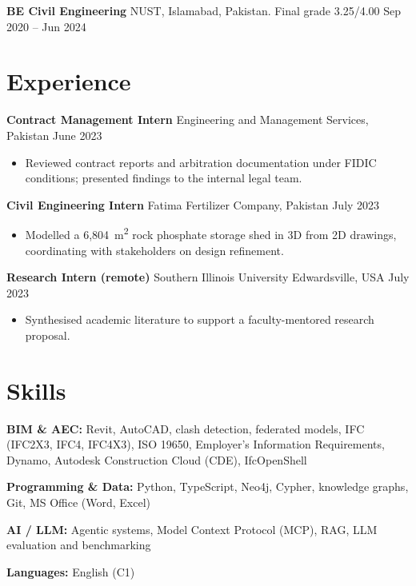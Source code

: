 \documentclass[a4paper,10.5pt]{article}
\newcommand{\datefill}{\dotfill}
\newcommand{\entry}[3]{\vspace{2.5pt}\noindent\textbf{#1} \textbar{} #2 \datefill{} #3\par\vspace{0.5pt}}
\newcommand{\skillrow}[2]{\noindent\textbf{#1:} #2\par\vspace{1pt}}
\begin{document}
\entry{BE Civil Engineering}{NUST, Islamabad, Pakistan. Final grade 3.25/4.00}{Sep 2020 -- Jun 2024}

\section{Experience}
\entry{Contract Management Intern}{Engineering and Management Services, Pakistan}{June 2023}
\begin{itemize}
  \item Reviewed contract reports and arbitration documentation under FIDIC
        conditions; presented findings to the internal legal team.
\end{itemize}

\entry{Civil Engineering Intern}{Fatima Fertilizer Company, Pakistan}{July 2023}
\begin{itemize}
  \item Modelled a 6,804~m\textsuperscript{2} rock phosphate storage shed in 3D from
        2D drawings, coordinating with stakeholders on design refinement.
\end{itemize}

\entry{Research Intern (remote)}{Southern Illinois University Edwardsville, USA}{July 2023}
\begin{itemize}
  \item Synthesised academic literature to support a faculty-mentored research proposal.
\end{itemize}

\section{Skills}

\skillrow{BIM \& AEC}{Revit, AutoCAD, clash detection, federated models, IFC (IFC2X3, IFC4, IFC4X3), ISO 19650, Employer's Information Requirements, Dynamo, Autodesk Construction Cloud (CDE), IfcOpenShell}
\skillrow{Programming \& Data}{Python, TypeScript, Neo4j, Cypher, knowledge graphs, Git, MS Office (Word, Excel)}
\skillrow{AI / LLM}{Agentic systems, Model Context Protocol (MCP), RAG, LLM evaluation and benchmarking}

\skillrow{Languages}{English (C1)}
\end{document}
